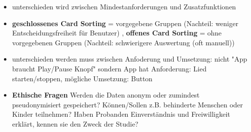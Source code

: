 \documentclass[12pt,landscape]{article}
\begin{document}
\begin{multicols}{3}
\begin{itemize}
\item unterschieden wird zwischen Mindestanforderungen und Zusatzfunktionen
\item \textbf{geschlossenes Card Sorting} = vorgegebene Gruppen (Nachteil: weniger Entscheidungsfreiheit für Benutzer) , \textbf{offenes Card Sorting} = ohne vorgegebenen Gruppen (Nachteil: schwierigere Auswertung (oft manuell))
\item unterschieden werden muss zwischen Anfoderung und Umsetzung: nicht "App braucht Play/Pause Knopf" sondern App hat Anforderung: Lied starten/stoppen, mögliche Umsetzung: Button
\item \textbf{Ethische Fragen} Werden die Daten anonym oder zumindest pseudonymisiert gespeichert? Können/Sollen z.B. behinderte Menschen oder Kinder teilnehmen? Haben Probanden Einverständnis und Freiwilligkeit erklärt, kennen sie den Zweck der Studie?
\end{itemize}

\end{multicols}
\end{document}
